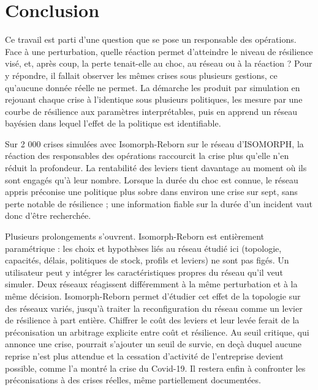 \section{Conclusion}
\label{sec:6}

Ce travail est parti d'une question que se pose un responsable des opérations. Face à une perturbation, quelle réaction permet d'atteindre le niveau de résilience visé, et, après coup, la perte tenait-elle au choc, au réseau ou à la réaction ? Pour y répondre, il fallait observer les mêmes crises sous plusieurs gestions, ce qu'aucune donnée réelle ne permet. La démarche les produit par simulation en rejouant chaque crise à l'identique sous plusieurs politiques, les mesure par une courbe de résilience aux paramètres interprétables, puis en apprend un réseau bayésien dans lequel l'effet de la politique est identifiable.

Sur 2 000 crises simulées avec Isomorph-Reborn sur le réseau d'ISOMORPH, la réaction des responsables des opérations raccourcit la crise plus qu'elle n'en réduit la profondeur. La rentabilité des leviers tient davantage au moment où ils sont engagés qu'à leur nombre. Lorsque la durée du choc est connue, le réseau appris préconise une politique plus sobre dans environ une crise sur sept, sans perte notable de résilience ; une information fiable sur la durée d'un incident vaut donc d'être recherchée.

Plusieurs prolongements s'ouvrent. Isomorph-Reborn est entièrement paramétrique : les choix et hypothèses liés au réseau étudié ici (topologie, capacités, délais, politiques de stock, profils et leviers) ne sont pas figés. Un utilisateur peut y intégrer les caractéristiques propres du réseau qu'il veut simuler. Deux réseaux réagissent différemment à la même perturbation et à la même décision. Isomorph-Reborn permet d'étudier cet effet de la topologie sur des réseaux variés, jusqu'à traiter la reconfiguration du réseau comme un levier de résilience à part entière. Chiffrer le coût des leviers et leur levée ferait de la préconisation un arbitrage explicite entre coût et résilience. Au seuil critique, qui annonce une crise, pourrait s'ajouter un seuil de survie, en deçà duquel aucune reprise n'est plus attendue et la cessation d'activité de l'entreprise devient possible, comme l'a montré la crise du Covid-19. Il restera enfin à confronter les préconisations à des crises réelles, même partiellement documentées.
